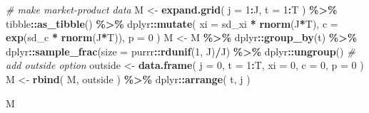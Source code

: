 \documentclass[
]{book}
\newenvironment{Shaded}{\begin{snugshade}}{\end{snugshade}}
\newcommand{\AttributeTok}[1]{\textcolor[rgb]{0.13,0.29,0.53}{#1}}
\newcommand{\CommentTok}[1]{\textcolor[rgb]{0.56,0.35,0.01}{\textit{#1}}}
\newcommand{\DecValTok}[1]{\textcolor[rgb]{0.00,0.00,0.81}{#1}}
\newcommand{\FunctionTok}[1]{\textcolor[rgb]{0.13,0.29,0.53}{\textbf{#1}}}
\newcommand{\NormalTok}[1]{#1}
\newcommand{\OtherTok}[1]{\textcolor[rgb]{0.56,0.35,0.01}{#1}}
\newcommand{\SpecialCharTok}[1]{\textcolor[rgb]{0.81,0.36,0.00}{\textbf{#1}}}
\begin{document}
\begin{Shaded}
\begin{Highlighting}[]
\CommentTok{\# make market{-}product data}
\NormalTok{M }\OtherTok{\textless{}{-}} 
  \FunctionTok{expand.grid}\NormalTok{(}
    \AttributeTok{j =} \DecValTok{1}\SpecialCharTok{:}\NormalTok{J, }
    \AttributeTok{t =} \DecValTok{1}\SpecialCharTok{:}\NormalTok{T}
\NormalTok{    ) }\SpecialCharTok{\%\textgreater{}\%}
\NormalTok{  tibble}\SpecialCharTok{::}\FunctionTok{as\_tibble}\NormalTok{() }\SpecialCharTok{\%\textgreater{}\%}
\NormalTok{  dplyr}\SpecialCharTok{::}\FunctionTok{mutate}\NormalTok{(}
    \AttributeTok{xi =}\NormalTok{ sd\_xi }\SpecialCharTok{*} \FunctionTok{rnorm}\NormalTok{(J}\SpecialCharTok{*}\NormalTok{T),}
    \AttributeTok{c =} \FunctionTok{exp}\NormalTok{(sd\_c }\SpecialCharTok{*} \FunctionTok{rnorm}\NormalTok{(J}\SpecialCharTok{*}\NormalTok{T)),}
    \AttributeTok{p =} \DecValTok{0}
\NormalTok{  ) }
\NormalTok{M }\OtherTok{\textless{}{-}} 
\NormalTok{  M }\SpecialCharTok{\%\textgreater{}\%}
\NormalTok{  dplyr}\SpecialCharTok{::}\FunctionTok{group\_by}\NormalTok{(t) }\SpecialCharTok{\%\textgreater{}\%}
\NormalTok{  dplyr}\SpecialCharTok{::}\FunctionTok{sample\_frac}\NormalTok{(}\AttributeTok{size =}\NormalTok{ purrr}\SpecialCharTok{::}\FunctionTok{rdunif}\NormalTok{(}\DecValTok{1}\NormalTok{, J)}\SpecialCharTok{/}\NormalTok{J) }\SpecialCharTok{\%\textgreater{}\%}
\NormalTok{  dplyr}\SpecialCharTok{::}\FunctionTok{ungroup}\NormalTok{()}
\CommentTok{\# add outside option}
\NormalTok{outside }\OtherTok{\textless{}{-}} 
  \FunctionTok{data.frame}\NormalTok{(}
    \AttributeTok{j =} \DecValTok{0}\NormalTok{, }
    \AttributeTok{t =} \DecValTok{1}\SpecialCharTok{:}\NormalTok{T, }
    \AttributeTok{xi =} \DecValTok{0}\NormalTok{, }
    \AttributeTok{c =} \DecValTok{0}\NormalTok{, }
    \AttributeTok{p =} \DecValTok{0}
\NormalTok{    )}
\NormalTok{M }\OtherTok{\textless{}{-}} 
  \FunctionTok{rbind}\NormalTok{(}
\NormalTok{    M,}
\NormalTok{    outside}
\NormalTok{    ) }\SpecialCharTok{\%\textgreater{}\%}
\NormalTok{  dplyr}\SpecialCharTok{::}\FunctionTok{arrange}\NormalTok{(}
\NormalTok{    t, }
\NormalTok{    j}
\NormalTok{    )}
\end{Highlighting}
\end{Shaded}

\begin{Shaded}
\begin{Highlighting}[]
\NormalTok{M}
\end{Highlighting}
\end{Shaded}
\end{document}
